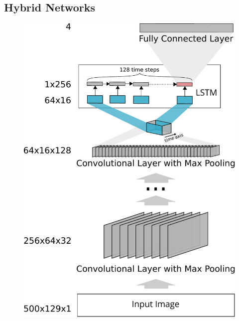 \subsection{Hybrid Networks}
\label{sec:hybrid_networks}

	\begin{figure}[]
  		\centering
    	\includegraphics[width=\textwidth, keepaspectratio]{img/crnn.pdf}
    	\caption{}
    	\label{fig:crnn}
	\end{figure}
	
